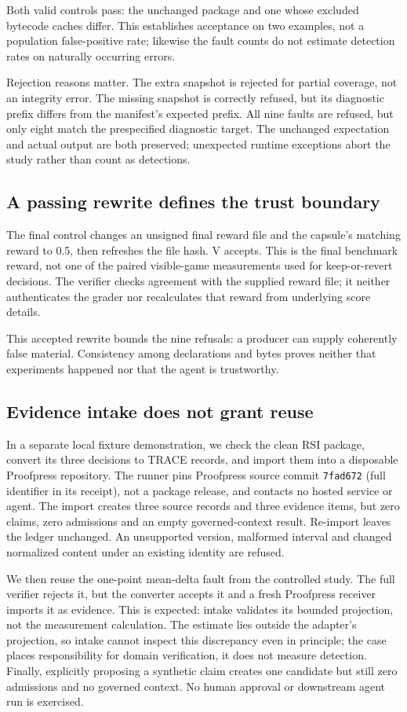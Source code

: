 \documentclass[conference]{IEEEtran}
\begin{document}
Both valid controls pass: the unchanged package and one whose excluded bytecode caches differ. This establishes acceptance on two examples, not a population false-positive rate; likewise the fault counts do not estimate detection rates on naturally occurring errors.

Rejection reasons matter. The extra snapshot is rejected for partial coverage, not an integrity error. The missing snapshot is correctly refused, but its diagnostic prefix differs from the manifest's expected prefix. All nine faults are refused, but only eight match the prespecified diagnostic target. The unchanged expectation and actual output are both preserved; unexpected runtime exceptions abort the study rather than count as detections.

\subsection{A passing rewrite defines the trust boundary}
The final control changes an unsigned final reward file and the capsule's matching reward to 0.5, then refreshes the file hash. V accepts. This is the final benchmark reward, not one of the paired visible-game measurements used for keep-or-revert decisions. The verifier checks agreement with the supplied reward file; it neither authenticates the grader nor recalculates that reward from underlying score details.

This accepted rewrite bounds the nine refusals: a producer can supply coherently false material. Consistency among declarations and bytes proves neither that experiments happened nor that the agent is trustworthy.

\subsection{Evidence intake does not grant reuse}
In a separate local fixture demonstration, we check the clean RSI package, convert its three decisions to TRACE records, and import them into a disposable Proofpress repository. The runner pins Proofpress source commit \texttt{7fad672} (full identifier in its receipt), not a package release, and contacts no hosted service or agent. The import creates three source records and three evidence items, but zero claims, zero admissions and an empty governed-context result. Re-import leaves the ledger unchanged. An unsupported version, malformed interval and changed normalized content under an existing identity are refused.

We then reuse the one-point mean-delta fault from the controlled study. The full verifier rejects it, but the converter accepts it and a fresh Proofpress receiver imports it as evidence. This is expected: intake validates its bounded projection, not the measurement calculation. The estimate lies outside the adapter's projection, so intake cannot inspect this discrepancy even in principle; the case places responsibility for domain verification, it does not measure detection. Finally, explicitly proposing a synthetic claim creates one candidate but still zero admissions and no governed context. No human approval or downstream agent run is exercised.
\end{document}

